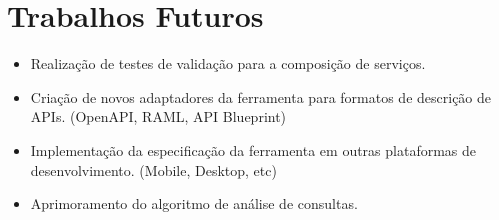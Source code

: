 \section[Trabalhos Futuros]{Trabalhos Futuros}

\begin{itemize}
  \item Realização de testes de validação para a composição de serviços.
  \item Criação de novos adaptadores da ferramenta para formatos de descrição de APIs. (OpenAPI, RAML, API Blueprint)
  \item Implementação da especificação da ferramenta em outras plataformas de desenvolvimento. (Mobile, Desktop, etc)
  \item Aprimoramento do algoritmo de análise de consultas.
\end{itemize}